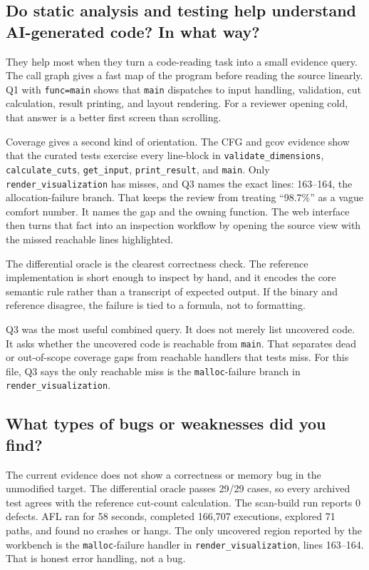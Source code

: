 \documentclass[11pt,twocolumn]{article}
\begin{document}
\subsection{Do static analysis and testing help understand AI-generated code? In what way?}

They help most when they turn a code-reading task into a small evidence query.
The call graph gives a fast map of the program before reading the source
linearly. Q1 with \texttt{func=main} shows that \texttt{main} dispatches to
input handling, validation, cut calculation, result printing, and layout
rendering. For a reviewer opening  cold, that answer
is a better first screen than scrolling.

Coverage gives a second kind of orientation. The CFG and gcov evidence show
that the curated tests exercise every line-block in
\texttt{validate\_dimensions}, \texttt{calculate\_cuts}, \texttt{get\_input},
\texttt{print\_result}, and \texttt{main}. Only
\texttt{render\_visualization} has misses, and Q3 names the exact lines:
163--164, the allocation-failure branch. That keeps the review from treating
``98.7\%'' as a vague comfort number. It names the gap and the owning function.
The web interface then turns that fact into an inspection workflow by opening
the source view with the missed reachable lines highlighted.

The differential oracle is the clearest correctness check. The reference
implementation is short enough to inspect by hand, and it encodes the core
semantic rule rather than a transcript of expected output. If the binary and
reference disagree, the failure is tied to a formula, not to formatting.

Q3 was the most useful combined query. It does not merely list uncovered code.
It asks whether the uncovered code is reachable from \texttt{main}. That
separates dead or out-of-scope coverage gaps from reachable handlers that tests
miss. For this file, Q3 says the only reachable miss is the
\texttt{malloc}-failure branch in \texttt{render\_visualization}.

\subsection{What types of bugs or weaknesses did you find?}

The current evidence does not show a correctness or memory bug in the
unmodified target. The differential oracle passes 29/29 cases, so every
archived test agrees with the reference cut-count calculation. The
scan-build run reports 0 defects. AFL ran for 58 seconds, completed 166,707
executions, explored 71 paths, and found no crashes or hangs. The only
uncovered region reported by the workbench is the \texttt{malloc}-failure
handler in \texttt{render\_visualization}, lines 163--164. That is honest
error handling, not a bug.
\end{document}
